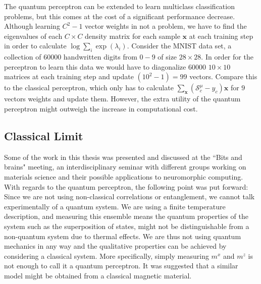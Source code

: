 \noindent The quantum perceptron can be extended to learn multiclass classification problems, but this comes at the cost of a significant performance decrease. Although learning $C^2-1$ vector weights in not a problem, we have to find the eigenvalues of each $C\times C$ density matrix for each sample $\mathbf{x}$ at each training step in order to calculate $\log{\sum_i \exp(\lambda_i)}$. Consider the MNIST data set, a collection of $60000$ handwritten digits from $0-9$ of size $28\times28$. In order for the perceptron to learn this data we would have to diagonalize $60000$ $10\times 10$ matrices at each training step and update $(10^2 - 1 )=99$ vectors. Compare this to the classical perceptron, which only has to calculate $\sum_{\mathbf{x}} (\mathcal{S}_{c}^\mu - y_c)\mathbf{x}$ for $9$ vectors weights and update them. However, the extra utility of the quantum perceptron might outweigh the increase in computational cost.

\clearpage
\subsection{Classical Limit}

Some of the work in this thesis was presented and discussed at the ``Bits and brains" meeting, an interdisciplinary seminar with different groups working on materials science and their possible applications to neuromorphic computing. With regards to the quantum perceptron, the following point was put forward: Since we are not using non-classical correlations or entanglement, we cannot talk experimentally of a quantum system. We are using a finite temperature description, and measuring this ensemble means the quantum properties of the system such as the superposition of states, might not be distinguishable from a non-quantum system due to thermal effects. We are thus not using quantum mechanics in any way and the qualitative properties can be achieved by considering a classical system. More specifically, simply measuring $m^x$ and $m^z$ is not enough to call it a quantum perceptron. It was suggested that a similar model might be obtained from a classical magnetic material. \newline

